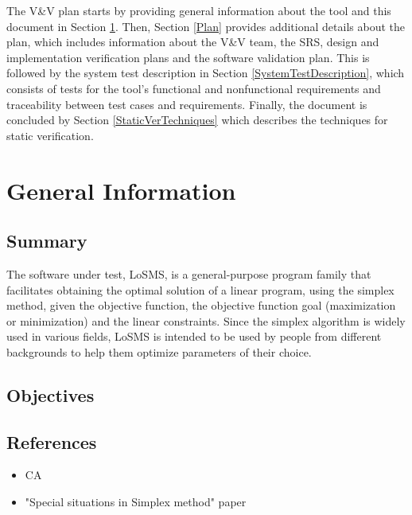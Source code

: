 \documentclass[12pt, titlepage]{article}
\newcommand{\famname}{LoSMS} %
\begin{document}
The V\&V plan starts by providing general information about the tool and this 
document in Section \ref{GeneralInfo}. Then, Section \ref{Plan} provides 
additional details about the plan, which includes information about the V\&V 
team, the SRS, design and implementation verification plans and the software 
validation plan. This is followed by the system test description in Section 
\ref{SystemTestDescription}, which consists of tests for the tool's functional 
and nonfunctional requirements and traceability between test cases and 
requirements. Finally, the document is concluded by Section 
\ref{StaticVerTechniques} which describes the techniques for static 
verification.

\section{General Information} \label{GeneralInfo}

\subsection{Summary}

The software under test, \famname{}, is a general-purpose program family that 
facilitates obtaining the optimal solution of a linear program, using the 
simplex method, given the objective function, the objective function goal 
(maximization or minimization) and the linear constraints. Since the simplex 
algorithm is widely used in various fields, \famname{} is intended to be used 
by people from different backgrounds to help them optimize parameters of their 
choice. 

\subsection{Objectives}


\subsection{References}

\begin{itemize}
	\item CA
	\item "Special situations in Simplex method" paper
\end{itemize}
\end{document}
